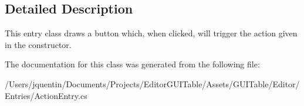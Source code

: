 \subsection{Detailed Description}
This entry class draws a button which, when clicked, will trigger the action given in the constructor. 



The documentation for this class was generated from the following file\+:\begin{DoxyCompactItemize}
\item 
/\+Users/jquentin/\+Documents/\+Projects/\+Editor\+G\+U\+I\+Table/\+Assets/\+G\+U\+I\+Table/\+Editor/\+Entries/Action\+Entry.\+cs\end{DoxyCompactItemize}

